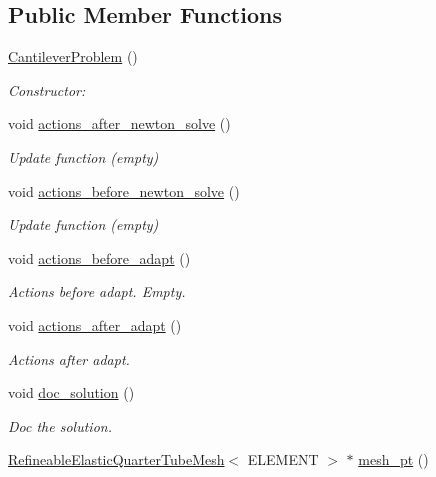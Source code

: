 \subsection*{Public Member Functions}
\begin{DoxyCompactItemize}
\item 
\hyperlink{classCantileverProblem_abba97fc4b8402bc0363fdf16322f6572}{Cantilever\+Problem} ()
\begin{DoxyCompactList}\small\item\em Constructor\+: \end{DoxyCompactList}\item 
void \hyperlink{classCantileverProblem_a4a70a4328d287aaa15c7811562122013}{actions\+\_\+after\+\_\+newton\+\_\+solve} ()
\begin{DoxyCompactList}\small\item\em Update function (empty) \end{DoxyCompactList}\item 
void \hyperlink{classCantileverProblem_a293902b825898ce043ffce3f0691f5a5}{actions\+\_\+before\+\_\+newton\+\_\+solve} ()
\begin{DoxyCompactList}\small\item\em Update function (empty) \end{DoxyCompactList}\item 
void \hyperlink{classCantileverProblem_a50f8964219c507562945655e0ed5fc23}{actions\+\_\+before\+\_\+adapt} ()
\begin{DoxyCompactList}\small\item\em Actions before adapt. Empty. \end{DoxyCompactList}\item 
void \hyperlink{classCantileverProblem_af4d135ace3eac657b38de362e1644c75}{actions\+\_\+after\+\_\+adapt} ()
\begin{DoxyCompactList}\small\item\em Actions after adapt. \end{DoxyCompactList}\item 
void \hyperlink{classCantileverProblem_a7571348f8724e71be4e67dc64cea3877}{doc\+\_\+solution} ()
\begin{DoxyCompactList}\small\item\em Doc the solution. \end{DoxyCompactList}\item 
\hyperlink{classRefineableElasticQuarterTubeMesh}{Refineable\+Elastic\+Quarter\+Tube\+Mesh}$<$ E\+L\+E\+M\+E\+NT $>$ $\ast$ \hyperlink{classCantileverProblem_a20f03209a5031e1bda39da9f2d2ce845}{mesh\+\_\+pt} ()

\end{DoxyCompactItemize}
